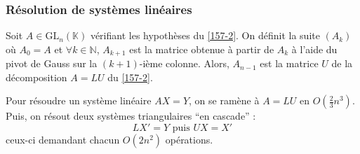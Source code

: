   \subsubsection{Résolution de systèmes linéaires}


  \begin{proposition}
    Soit $A \in \mathrm{GL}_n(\mathbb{K})$ vérifiant les hypothèses du \cref{157-2}. On définit la suite $(A_k)$ où $A_0 = A$ et $\forall k \in \mathbb{N}$, $A_{k+1}$ est la matrice obtenue à partir de $A_k$ à l'aide du pivot de Gauss sur la $(k+1)$-ième colonne. Alors, $A_{n-1}$ est la matrice $U$ de la décomposition $A = LU$ du \cref{157-2}.
  \end{proposition}

  \begin{remark}
    Pour résoudre un système linéaire $AX = Y$, on se ramène à $A = LU$ en $O \left( \frac{2}{3}n^3 \right)$. Puis, on résout deux systèmes triangulaires ``en cascade'' :
    \[ LX' = Y \text{ puis } UX = X' \]
    ceux-ci demandant chacun $O(2n^2)$ opérations.
  \end{remark}

